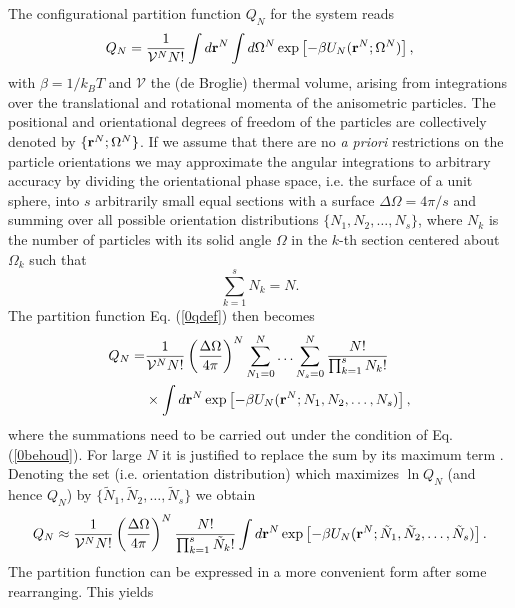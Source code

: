 {The configurational partition function $Q_{N}$ for the system reads
\begin{equation}
Q_{N}=\frac{1}{\mathcal{V} ^{N} N!}\int d{\bf r}^{N}\int d\Omega ^{N}\exp\left[-\beta U_{N}({\bf r}^{N}; \Omega^{N})\right],
\label{0qdef}
\end{equation}
with $\beta= 1/k_{B}T$ and $\mathcal{V}$ the (de Broglie) thermal volume, arising from
integrations over the translational and rotational momenta of the anisometric particles.
The positional and orientational degrees of freedom of the particles are collectively denoted by
$\{{\bf r}^{N};\Omega^{N}\}$.
If we assume that there are no  {\em a priori} restrictions on the particle orientations
we may approximate the  angular integrations  to arbitrary accuracy by dividing
the orientational phase space, i.e. the surface of a unit sphere, into $s$
arbitrarily small equal sections  with a surface $\Delta \Omega = 4\pi/s$ and summing over all
possible orientation distributions $\{N_{1},N_{2}, \ldots, N_{s}\}$, where $N_{k}$ is the
number of particles with its solid angle $\Omega$ in the $k$-th section centered about
$\Omega_{k}$ such that
\begin{equation}
\sum _{k=1}^{s} N_{k} =N. \label{0behoud}
\end{equation}
The partition function Eq. (\ref{0qdef}) then becomes
\begin{align}
Q_{N}=&\frac{1}{\mathcal{V} ^{N} N!}\left(\frac{\Delta \Omega}{4\pi}\right)^{N}
\sum_{N_{1}=0}^{N}\ldots \sum_{N_{s}=0}^{N}\frac{N!}{\prod_{k=1}^{s}N_{k}!} \nonumber \\
&\times\int d{\bf r}^{N}
\exp\left[-\beta U_{N}({\bf r}^{N}; N_{1},N_{2},\ldots,N_{s})\right], \label{0Qalgemeen}
\end{align}
where the summations need to be carried out under the condition of Eq. (\ref{0behoud}).
For large $N$ it is justified to replace the sum  by its maximum term \cite{Hill}.
Denoting the set (i.e. orientation distribution) which maximizes $\ln Q_{N}$ (and hence $Q_{N}$) by
 $\{\tilde{N}_{1},\tilde{N}_{2},\ldots,\tilde{N}_{s}\}$ we obtain
\begin{equation}
Q_{N}\approx \frac{1}{\mathcal{V} ^{N} N!}\left(\frac{\Delta \Omega}{4\pi}\right)^{N}
\frac{N!}{\prod_{k=1}^{s}\tilde{N}_{k}!}\int d{\bf r}^{N}
\exp\left[-\beta U_{N}({\bf r}^{N}; \tilde{N}_{1},\tilde{N}_{2},\ldots,\tilde{N}_{s})\right].
\end{equation}
The partition function can be expressed in a more convenient form after some rearranging. This yields
\begin{equation}

\end{equation}}
